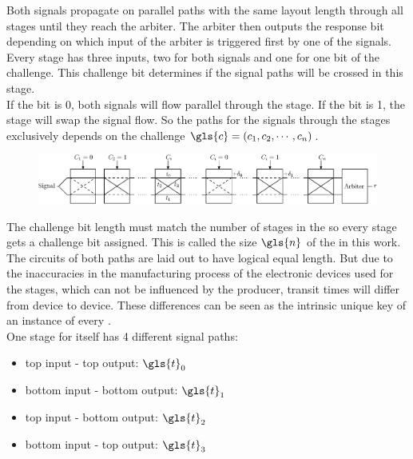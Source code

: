 Both signals propagate on parallel paths with the same layout length through all stages until they reach the arbiter.
The arbiter then outputs the response bit depending on which input of the arbiter is triggered first by one of the signals.\\
Every stage has three inputs, two for both signals and one for one bit of the challenge.
This challenge bit determines if the signal paths will be crossed in this stage.\\
If the bit is 0, both signals will flow parallel through the stage.
If the bit is 1, the stage will swap the signal flow.
So the paths for the signals through the stages exclusively depends on the challenge $\gls{c} = (c_1, c_2, \cdots, c_n)$.

\begin{figure}[ht]
\centering
\includegraphics[width=1.00\textwidth]{images/arbiter_puf.eps}
\caption{\apuf}
\label{fig:arbiter}
\end{figure}

The challenge bit length must match the number of stages in the \apuf so every stage gets a challenge bit assigned. 
This is called the size $\gls{n}$ of the \apuf in this work.\\
The circuits of both paths are laid out to have logical equal length.
But due to the inaccuracies in the manufacturing process of the electronic devices used for the stages, which can not be influenced by the producer, transit times will differ from device to device.
These differences can be seen as the intrinsic unique key of an instance of every \apuf.\\
One stage for itself has 4 different signal paths: 

\begin{itemize}
\item top input - top output: $\gls{t}_0$
\item bottom input - bottom output: $\gls{t}_1$
\item top input - bottom output: $\gls{t}_2$
\item bottom input - top output: $\gls{t}_3$
\end{itemize}

